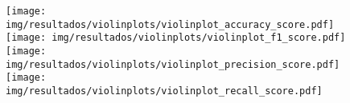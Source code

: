 \begin{figure}
	\texttt{[image: img/resultados/violinplots/violinplot\_accuracy\_score.pdf]}
	\texttt{[image: img/resultados/violinplots/violinplot\_f1\_score.pdf]}
	\texttt{[image: img/resultados/violinplots/violinplot\_precision\_score.pdf]}
	\texttt{[image: img/resultados/violinplots/violinplot\_recall\_score.pdf]}
	\caption{}
\end{figure}
